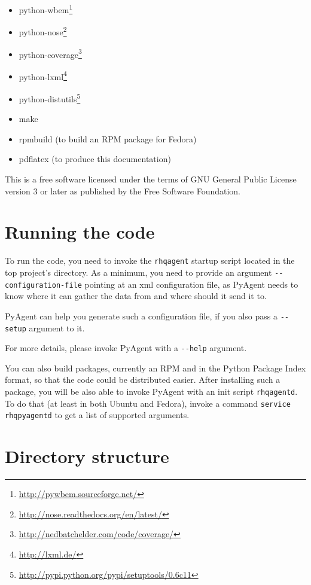 \documentclass[a4paper,twoside,11pt]{article}
\begin{document}
		\begin{itemize}
			\item python-wbem\footnote{\href{http://pywbem.sourceforge.net/}{http://pywbem.sourceforge.net/}}
			\item python-nose\footnote{\href{http://nose.readthedocs.org/en/latest/}{http://nose.readthedocs.org/en/latest/}}
			\item python-coverage\footnote{\href{http://nedbatchelder.com/code/coverage/}{http://nedbatchelder.com/code/coverage/}}
			\item python-lxml\footnote{\href{http://lxml.de/}{http://lxml.de/}}
			\item python-distutils\footnote{\href{http://pypi.python.org/pypi/setuptools/0.6c11}{http://pypi.python.org/pypi/setuptools/0.6c11}}
			\item make
			\item rpmbuild (to build an RPM package for Fedora)
			\item pdflatex (to produce this documentation)
		\end{itemize}

		This is a free software licensed under the terms of GNU General Public License version 3 or later as published by the Free Software Foundation.

	\section{Running the code}
		To run the code, you need to invoke the \texttt{rhqagent} startup script located in the top project's directory. As a minimum, you need to provide an argument \texttt{-{}-configuration-file} pointing at an xml configuration file, as PyAgent needs to know where it can gather the data from and where should it send it to.

		PyAgent can help you generate such a configuration file, if you also pass a \texttt{-{}-setup} argument to it.

		For more details, please invoke PyAgent with a \texttt{-{}-help} argument.

		You can also build packages, currently an RPM and in the Python Package Index format, so that the code could be distributed easier. After installing such a package, you will be also able to invoke PyAgent with an init script \texttt{rhqagentd}. To do that (at least in both Ubuntu and Fedora), invoke a command \texttt{service rhqpyagentd} to get a list of supported arguments.

	\section{Directory structure}
\end{document}
